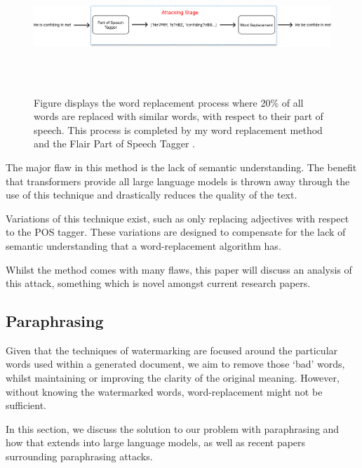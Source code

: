 \documentclass{l4proj}
\theoremstyle{definition}
\begin{document}
        \begin{figure}[h]
            \centering
            \includegraphics[height=5cm, width=1\linewidth, keepaspectratio]{images/background/word-replacement-process.pdf}
            \caption{Figure displays the word replacement process where 20\% of all words are replaced with similar words, with respect to their part of speech. This process is completed by my word replacement method and the Flair Part of Speech Tagger \citep{akbik2018coling}.}
            \label{fig:word-replacement-process}
        \end{figure}
        
        The major flaw in this method is the lack of semantic understanding. The benefit that transformers provide all large language models is thrown away through the use of this technique and drastically reduces the quality of the text.
        
        Variations of this technique exist, such as only replacing adjectives with respect to the POS tagger. These variations are designed to compensate for the lack of semantic understanding that a word-replacement algorithm has.

        Whilst the method comes with many flaws, this paper will discuss an analysis of this attack, something which is novel amongst current research papers.
    
    \subsection{Paraphrasing}
        Given that the techniques of watermarking are focused around the particular words used within a generated document, we aim to remove those `bad' words, whilst maintaining or improving the clarity of the original meaning. However, without knowing the watermarked words, word-replacement might not be sufficient. 

        In this section, we discuss the solution to our problem with paraphrasing and how that extends into large language models, as well as recent papers surrounding paraphrasing attacks.
\end{document}
